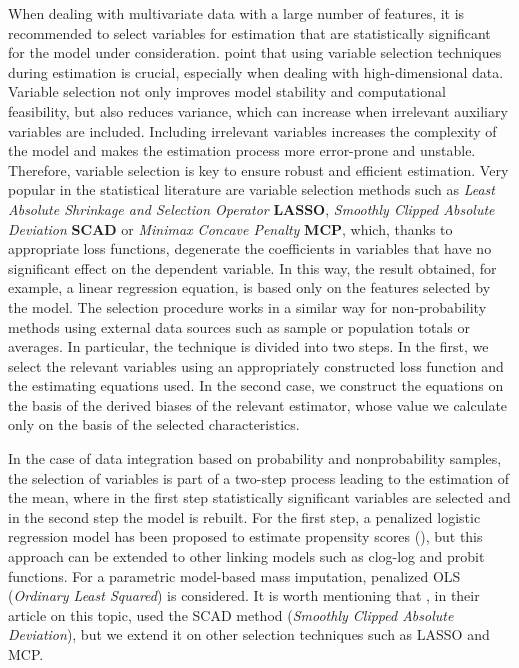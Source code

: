 \documentclass[
]{jss}
\begin{document}
When dealing with multivariate data with a large number of features, it
is recommended to select variables for estimation that are statistically
significant for the model under consideration.
\citet{yang_asymptotic_2020} point that using variable selection
techniques during estimation is crucial, especially when dealing with
high-dimensional data. Variable selection not only improves model
stability and computational feasibility, but also reduces variance,
which can increase when irrelevant auxiliary variables are included.
Including irrelevant variables increases the complexity of the model and
makes the estimation process more error-prone and unstable. Therefore,
variable selection is key to ensure robust and efficient estimation.
Very popular in the statistical literature are variable selection
methods such as \textit{Least Absolute Shrinkage and Selection Operator}
\textbf{LASSO}, \textit{Smoothly Clipped Absolute Deviation}
\textbf{SCAD} or \textit{Minimax Concave Penalty} \textbf{MCP}, which,
thanks to appropriate loss functions, degenerate the coefficients in
variables that have no significant effect on the dependent variable. In
this way, the result obtained, for example, a linear regression
equation, is based only on the features selected by the model. The
selection procedure works in a similar way for non-probability methods
using external data sources such as sample or population totals or
averages. In particular, the technique is divided into two steps. In the
first, we select the relevant variables using an appropriately
constructed loss function and the estimating equations used. In the
second case, we construct the equations on the basis of the derived
biases of the relevant estimator, whose value we calculate only on the
basis of the selected characteristics.

In the case of data integration based on probability and nonprobability
samples, the selection of variables is part of a two-step process
leading to the estimation of the mean, where in the first step
statistically significant variables are selected and in the second step
the model is rebuilt. For the first step, a penalized logistic
regression model has been proposed to estimate propensity scores
(\citet{yang_doubly_2020}), but this approach can be extended to other
linking models such as clog-log and probit functions. For a parametric
model-based mass imputation, penalized OLS
(\textit{Ordinary Least Squared}) is considered. It is worth mentioning
that \citet{yang_asymptotic_2020}, in their article on this topic, used
the SCAD method (\textit{Smoothly Clipped Absolute Deviation}), but we
extend it on other selection techniques such as LASSO and MCP.
\end{document}
